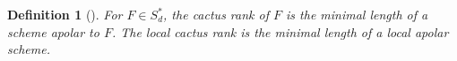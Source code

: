 \documentclass[a4paper,11p]{amsart}
\newtheorem{defn0}{Definition}[section]
\newenvironment{definition}{ \begin{defn0}}{\end{defn0}}
\newcommand{\K}{\mathbb K}
\begin{document}


\begin{definition}[\cite{BR13}]
For $F\in S_d^*$, the \emph{cactus rank} of $F$ is the minimal length of a scheme apolar to $F$. The \emph{local cactus rank} is the minimal length of a local apolar scheme.
\end{definition}


\end{document}
